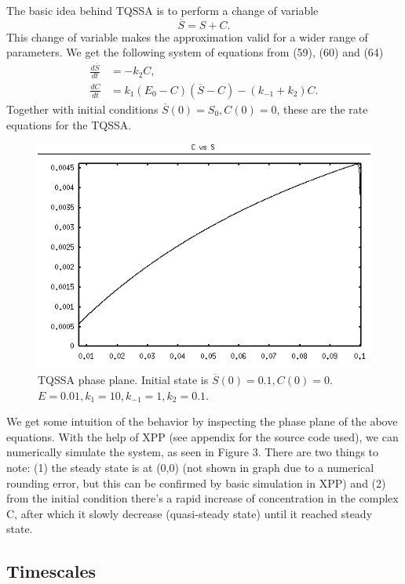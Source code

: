 \documentclass[12pt]{article}
\begin{document}
The basic idea behind TQSSA is to perform a change of variable
\begin{equation}
\overline{S} = S + C.
\end{equation}
This change of variable makes the approximation valid for a wider
range of parameters. We get the following system of equations from
(59), (60) and (64)
\begin{align}
\frac{d\overline{S}}{dt} &= - k_2 C, \\
\frac{dC}{dt} &= k_1(E_0-C)(\overline{S}-C)-(k_{-1}+ k_2) C.
\end{align}
Together with initial conditions $\overline{S}(0)=S_0, C(0)=0$, these
are the rate equations for the TQSSA.
\begin{figure}[ht!]
\centering
\includegraphics[width=120mm]
{tqssa-phase-plane-b.png}
\caption{TQSSA phase plane. Initial state is $\overline{S}(0)=0.1,
  C(0)=0$. $E=0.01, k_1=10, k_{-1}=1, k_2=0.1$.}
\label{overflow}
\end{figure}

We get some intuition of the behavior by inspecting the phase plane of
the above equations. With the help of XPP (see appendix for the source
code used), we can numerically simulate the system, as seen in Figure
3. There are two things to note: (1) the steady state is at (0,0) (not
shown in graph due to a numerical rounding error, but this can be
confirmed by basic simulation in XPP) and (2) from the initial
condition there's a rapid increase of concentration in the complex C,
after which it slowly decrease (quasi-steady state) until it reached
steady state.

\subsection{Timescales}
\end{document}

